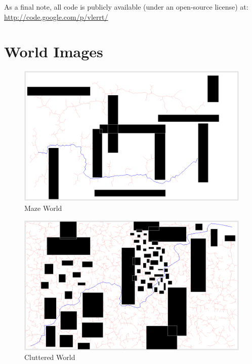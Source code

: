 \documentclass[10pt,twoside,twocolumn]{article}
\begin{document}
As a final note, all code is publicly available (under an open-source license) at:\\ 
\url{http://code.google.com/p/vlerrt/}

{}


\appendix 
\section{World Images}
\begin{figure}[h]
\begin{center}
\includegraphics[scale=0.20]{paper_world.png}
\end{center}
\caption{Maze World}
\end{figure}
\begin{figure}[h]
\begin{center}
\includegraphics[scale=0.2]{cluttered_world.png}
\end{center}
\caption{Cluttered World}
\end{figure}
\end{document}
